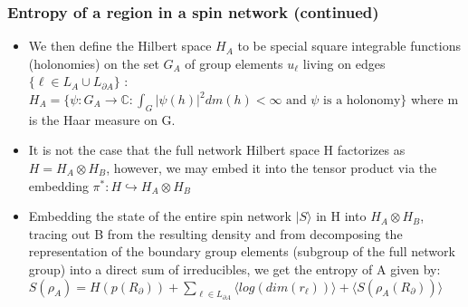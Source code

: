 \documentclass[11pt]{beamer}
\newcommand{\vs}{\vskip10pt}
\begin{document}
\begin{frame}
	
	\frametitle{Entropy of a region in a spin network (continued)}
	
	\begin{itemize}
		
		\item We then define the Hilbert space $H_A$ to be special square integrable functions (holonomies) on the set $G_A$ of group elements $u_{\ell}$ living on edges $\{\ell \in L_A \cup L_{\partial A}\}$ : $H_A = \{\psi: G_A \rightarrow \mathbb{C}: \int_G |\psi (h)|^2 dm(h) < \infty \text{ and } \psi \text{ is a holonomy} \}$ where m is the Haar measure on G. 
		
		\item It is not the case that the full network Hilbert space H factorizes as $H = H_A \otimes H_B$, however, we may embed it into the tensor product via the embedding $\pi^*: H \hookrightarrow H_A \otimes H_B$ 
		
		\item Embedding the state of the entire spin network $|S \rangle$ in H into $H_A \otimes H_B$, tracing out B from the resulting density and from decomposing the representation of the boundary group elements (subgroup of the full network group) into a direct sum of irreducibles, we get the entropy of A given by: 
		\vs
		$S(\rho_A) = H(p(R_{\partial})) + \sum_{\ell \in L_{\partial A}} \langle log(dim(r_{\ell})) \rangle + \langle S(\rho_{A}(R_{\partial})) \rangle $
		
	\end{itemize}
	
\end{frame}
\end{document}
